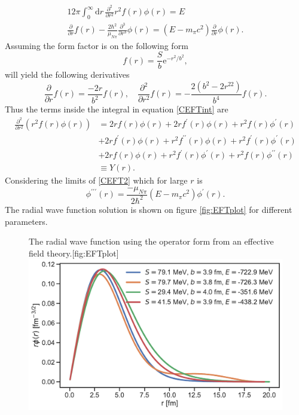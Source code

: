 \begin{align}\label{CEFTint}
	12\pi \int_0^\infty \text{d}r \, \frac{\partial^2}{\partial r^2}r^2f(r)\phi(r) =E \\
	\frac{\partial}{\partial r}f(r)-\frac{2\hbar^2}{\mu_{N\pi}} \frac{\partial^3}{\partial r^3}\phi(r) = (E-m_\pi c^2)\frac{\partial}{\partial r}\phi(r)\label{CEFT2}.
\end{align}
Assuming the form factor is on the following form
\begin{equation}
	f(r) = \frac{S}{b}\text{e}^{-r^2/b^2},
\end{equation}
will yield the following derivatives
\begin{equation}
	\frac{\partial}{\partial r} f(r) = \frac{-2r}{b^2}f(r), \quad \frac{\partial^2}{\partial r^2} f(r)=-\frac{2(b^2-2r^22)}{b^4}f(r).
\end{equation}
Thus the terms inside the integral in equation \eqref{CEFTint} are
\begin{equation}
	\begin{split}
	\frac{\partial^2}{\partial r^2}(r^2f(r)\phi(r)) & = 2rf(r)\phi(r)+2rf^\prime(r)\phi(r)+r^2f(r)\phi ^\prime(r)
	\\&+2rf^\prime(r)\phi(r)+r^2f^{\prime\prime}(r)\phi(r)+r^2f^\prime(r)\phi^\prime(r)\\
	&+2rf(r)\phi(r)+r^2f^\prime(r)\phi^\prime (r)+r^2f(r)\phi^{\prime\prime}(r) \\&\equiv Y(r). \label{manyterms}
	\end{split}
\end{equation}
Considering the limits of \eqref{CEFT2} which for large $r$ is
\begin{equation}
	\phi^{\prime\prime\prime}(r) =\frac{-\mu_{N\pi}}{2\hbar^2}(E-m_\pi c^2)\phi^\prime(r).
\end{equation}
The radial wave function solution is shown on figure \ref{fig:EFTplot} for different parameters.
\begin{figure}[H]
	\begin{sidecaption}{The radial wave function using the operator form from an effective field theory.}[fig:EFTplot]
		\includegraphics[width=\linewidth]{Figures/EFTradial.pdf}
	\end{sidecaption}
\end{figure}
